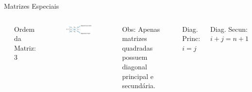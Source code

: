 \documentclass[aspectratio=169,xcolor=dvipsnames]{beamer}
\begin{document}
\begin{frame}{Matrizes Especiais}
  \begin{columns}[c] %

      \begin{center}
      \end{center}
        \begin{center}
          Ordem da Matriz: 3
        \end{center} 

      \begin{figure}[htb!]
        \centering
        \includegraphics[width=1.0\linewidth]{images/quadrada.png}
      \end{figure}
      Obs: Apenas matrizes quadradas possuem diagonal principal e secundária.
      
      Diag. Princ: $i = j$

      Diag. Secun: $i + j = n + 1$

  \end{columns}
  
\end{frame}

\end{document}
